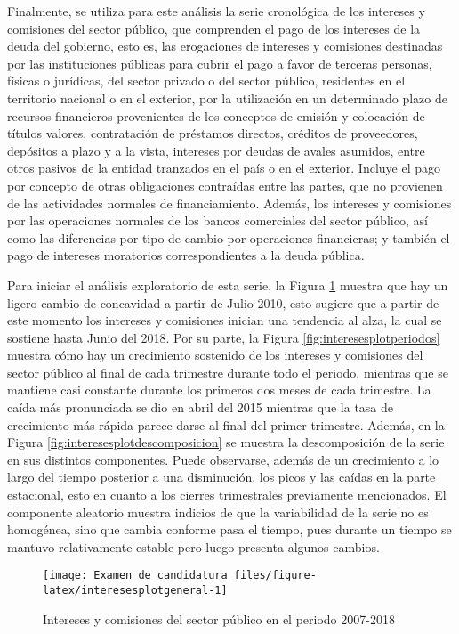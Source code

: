 \documentclass[
]{article}
\begin{document}
Finalmente, se utiliza para este análisis la serie cronológica de los
intereses y comisiones del sector público, que comprenden el pago de los
intereses de la deuda del gobierno, esto es, las erogaciones de
intereses y comisiones destinadas por las instituciones públicas para
cubrir el pago a favor de terceras personas, físicas o jurídicas, del
sector privado o del sector público, residentes en el territorio
nacional o en el exterior, por la utilización en un determinado plazo de
recursos financieros provenientes de los conceptos de emisión y
colocación de títulos valores, contratación de préstamos directos,
créditos de proveedores, depósitos a plazo y a la vista, intereses por
deudas de avales asumidos, entre otros pasivos de la entidad tranzados
en el país o en el exterior. Incluye el pago por concepto de otras
obligaciones contraídas entre las partes, que no provienen de las
actividades normales de financiamiento. Además, los intereses y
comisiones por las operaciones normales de los bancos comerciales del
sector público, así como las diferencias por tipo de cambio por
operaciones financieras; y también el pago de intereses moratorios
correspondientes a la deuda pública.

Para iniciar el análisis exploratorio de esta serie, la Figura
\ref{fig:interesesplotgeneral} muestra que hay un ligero cambio de
concavidad a partir de Julio 2010, esto sugiere que a partir de este
momento los intereses y comisiones inician una tendencia al alza, la
cual se sostiene hasta Junio del 2018. Por su parte, la Figura
\ref{fig:interesesplotperiodos} muestra cómo hay un crecimiento
sostenido de los intereses y comisiones del sector público al final de
cada trimestre durante todo el periodo, mientras que se mantiene casi
constante durante los primeros dos meses de cada trimestre. La caída más
pronunciada se dio en abril del 2015 mientras que la tasa de crecimiento
más rápida parece darse al final del primer trimestre. Además, en la
Figura \ref{fig:interesesplotdescomposicion} se muestra la
descomposición de la serie en sus distintos componentes. Puede
observarse, además de un crecimiento a lo largo del tiempo posterior a
una disminución, los picos y las caídas en la parte estacional, esto en
cuanto a los cierres trimestrales previamente mencionados. El componente
aleatorio muestra indicios de que la variabilidad de la serie no es
homogénea, sino que cambia conforme pasa el tiempo, pues durante un
tiempo se mantuvo relativamente estable pero luego presenta algunos
cambios.

\begin{figure}[H]
\texttt{[image: Examen\_de\_candidatura\_files/figure-latex/interesesplotgeneral-1]} \caption{Intereses y comisiones del sector público en el periodo 2007-2018}\label{fig:interesesplotgeneral}
\end{figure}
\end{document}
